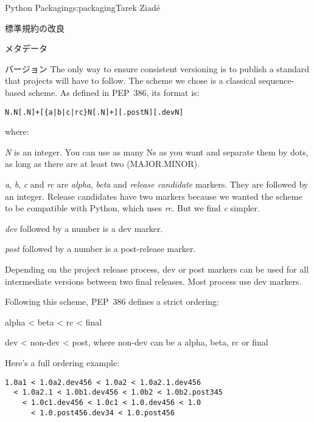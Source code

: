 \begin{aosachapter}{Python Packaging}{s:packaging}{Tarek Ziad\'{e}}
\begin{aosasect1}{標準規約の改良}
\begin{aosasect2}{メタデータ}
\begin{aosasect3}{バージョン}
The only way to ensure consistent versioning is to publish a standard
that projects will have to follow.  The scheme we chose is a
classical sequence-based scheme.  As defined in PEP~386, its format
is:

\begin{verbatim}
N.N[.N]+[{a|b|c|rc}N[.N]+][.postN][.devN]
\end{verbatim}

\noindent where:

\begin{aosaitemize}

  \item \emph{N} is an integer. You can use as many Ns as you want and
  separate them by dots, as long as there are at least two
  (MAJOR.MINOR).

  \item \emph{a}, \emph{b}, \emph{c} and \emph{rc} are \emph{alpha},
  \emph{beta} and \emph{release candidate} markers. They are followed
  by an integer. Release candidates have two markers because we wanted
  the scheme to be compatible with Python, which uses \emph{rc}. But
  we find \emph{c} simpler.

  \item \emph{dev} followed by a number is a dev marker.

  \item \emph{post} followed by a number is a post-release marker.

\end{aosaitemize}

\noindent
Depending on the project release process, dev or post markers can be used for
all intermediate versions between two final releases. Most process use
dev markers.

\pagebreak

Following this scheme, PEP~386 defines a strict ordering:

\begin{aosaitemize}

  \item alpha {\textless} beta {\textless} rc {\textless} final

  \item dev {\textless} non-dev {\textless} post, where non-dev can be a alpha, beta,
  rc or final

\end{aosaitemize}

\noindent
Here's a full ordering example:

\begin{verbatim}
1.0a1 < 1.0a2.dev456 < 1.0a2 < 1.0a2.1.dev456
  < 1.0a2.1 < 1.0b1.dev456 < 1.0b2 < 1.0b2.post345
    < 1.0c1.dev456 < 1.0c1 < 1.0.dev456 < 1.0
      < 1.0.post456.dev34 < 1.0.post456
\end{verbatim}


\end{aosasect3}
\end{aosasect2}
\end{aosasect1}
\end{aosachapter}

